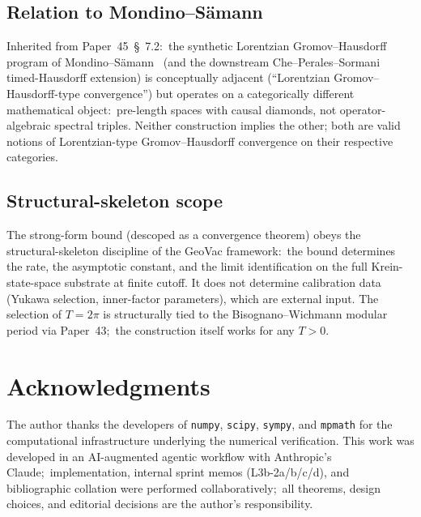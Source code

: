 \documentclass[11pt,a4paper]{article}
\theoremstyle{plain}
\theoremstyle{definition}
\begin{document}
\subsection{Relation to Mondino--S\"amann}\label{sec:mondino_samann_op}

Inherited from Paper~45~\S~7.2:\ the synthetic Lorentzian
Gromov--Hausdorff program of
Mondino--S\"amann~\cite{mondino_samann2025} (and the downstream
Che--Perales--Sormani~\cite{che_perales_sormani2025} timed-Hausdorff
extension) is conceptually adjacent (``Lorentzian Gromov--Hausdorff-type
convergence'') but operates on a categorically different mathematical
object:\ pre-length spaces with causal diamonds, not operator-algebraic
spectral triples. Neither construction implies the other; both are
valid notions of Lorentzian-type Gromov--Hausdorff convergence on their
respective categories.

\subsection{Structural-skeleton scope}\label{sec:scope_skeleton_op}

The strong-form bound (descoped as a convergence theorem) obeys the structural-skeleton
discipline of the GeoVac framework:\ the bound determines the rate,
the asymptotic constant, and the limit identification on the full
Krein-state-space substrate at finite cutoff. It does not determine
calibration data (Yukawa selection, inner-factor parameters), which are
external input. The selection of $T = 2\pi$ is structurally tied to
the Bisognano--Wichmann modular period via Paper~43;\ the construction
itself works for any $T > 0$.

\section*{Acknowledgments}

The author thanks the developers of \texttt{numpy}, \texttt{scipy},
\texttt{sympy}, and \texttt{mpmath} for the computational infrastructure
underlying the numerical verification. This work was developed in an
AI-augmented agentic workflow with Anthropic's Claude;\ implementation,
internal sprint memos (L3b-2a/b/c/d), and bibliographic collation were
performed collaboratively;\ all theorems, design choices, and editorial
decisions are the author's responsibility.
\end{document}
